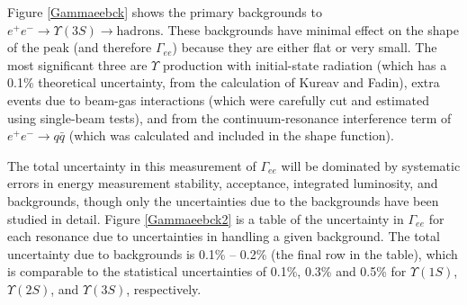 Figure \ref{Gammaeebck} shows the primary
backgrounds to $e^+ e^- \to \Upsilon(3S) \to \mbox{hadrons}$.  These
backgrounds have minimal effect on the shape of the peak (and
therefore $\Gamma_{ee}$) because they are either flat or very small.
The most significant three are $\Upsilon$ production with
initial-state radiation (which has a 0.1\% theoretical uncertainty,
from the calculation of Kureav and Fadin\cite{kureavfadin}), extra
events due to beam-gas interactions (which were carefully cut and
estimated using single-beam tests), and from the continuum-resonance
interference term of $e^+e^- \to q\bar{q}$ (which was calculated and
included in the shape function).

The total uncertainty in this measurement of $\Gamma_{ee}$ will be
dominated by systematic errors in energy measurement stability,
acceptance, integrated luminosity, and backgrounds, though only the
uncertainties due to the backgrounds have been studied in detail.
Figure \ref{Gammaeebck2} is a table of the
uncertainty in $\Gamma_{ee}$ for each resonance due to uncertainties
in handling a given background.  The total uncertainty due to
backgrounds is 0.1\% -- 0.2\% (the final row in the table), which is
comparable to the statistical uncertainties of 0.1\%, 0.3\% and 0.5\%
for $\Upsilon(1S)$, $\Upsilon(2S)$, and $\Upsilon(3S)$, respectively.

